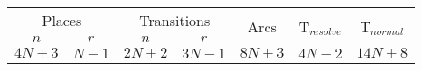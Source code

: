 \begin{tabular}[h]{c|c|c|c|c|c|c}
  \multicolumn{2}{c|}{Places} &
  \multicolumn{2}{c|}{Transitions} & \multirow{2}{*}{Arcs} &
  \multirow{2}{*}{T$_{resolve}$} &
  \multirow{2}{*}{T$_{normal}$} \\
  $n$ & $r$ & $n$ & $r$ & & & \\
  \hline
  $4N+3$ & $N-1$ & $2N+2$ & $3N-1$ & $8N+3$ & $4N-2$ & $14N+8$ \\
\end{tabular}
